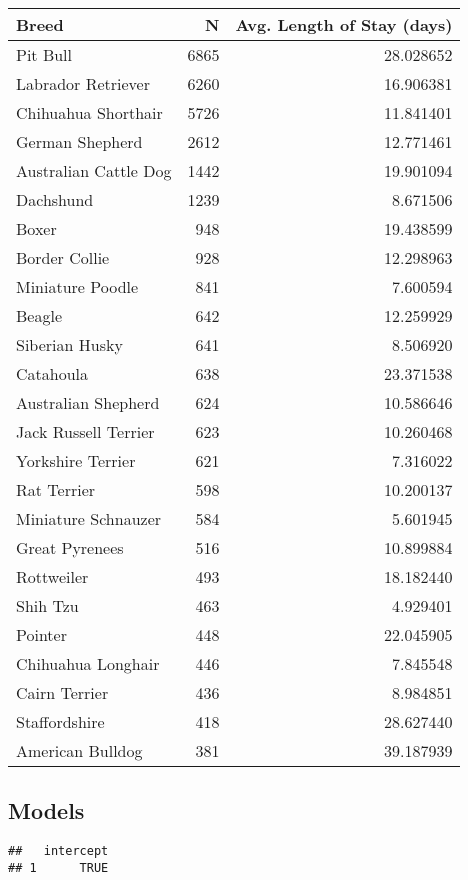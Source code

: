 \documentclass[
  11pt,
]{article}
\begin{document}
\begin{tabular}{l|r|r}
\hline
Breed & N & Avg. Length of Stay (days)\\
\hline
Pit Bull & 6865 & 28.028652\\
\hline
Labrador Retriever & 6260 & 16.906381\\
\hline
Chihuahua Shorthair & 5726 & 11.841401\\
\hline
German Shepherd & 2612 & 12.771461\\
\hline
Australian Cattle Dog & 1442 & 19.901094\\
\hline
Dachshund & 1239 & 8.671506\\
\hline
Boxer & 948 & 19.438599\\
\hline
Border Collie & 928 & 12.298963\\
\hline
Miniature Poodle & 841 & 7.600594\\
\hline
Beagle & 642 & 12.259929\\
\hline
Siberian Husky & 641 & 8.506920\\
\hline
Catahoula & 638 & 23.371538\\
\hline
Australian Shepherd & 624 & 10.586646\\
\hline
Jack Russell Terrier & 623 & 10.260468\\
\hline
Yorkshire Terrier & 621 & 7.316022\\
\hline
Rat Terrier & 598 & 10.200137\\
\hline
Miniature Schnauzer & 584 & 5.601945\\
\hline
Great Pyrenees & 516 & 10.899884\\
\hline
Rottweiler & 493 & 18.182440\\
\hline
Shih Tzu & 463 & 4.929401\\
\hline
Pointer & 448 & 22.045905\\
\hline
Chihuahua Longhair & 446 & 7.845548\\
\hline
Cairn Terrier & 436 & 8.984851\\
\hline
Staffordshire & 418 & 28.627440\\
\hline
American Bulldog & 381 & 39.187939\\
\hline
\end{tabular}
\endgroup{}

\hypertarget{models}{%
\subsection{Models}\label{models}}

\begin{verbatim}
##   intercept
## 1      TRUE
\end{verbatim}
\end{document}
